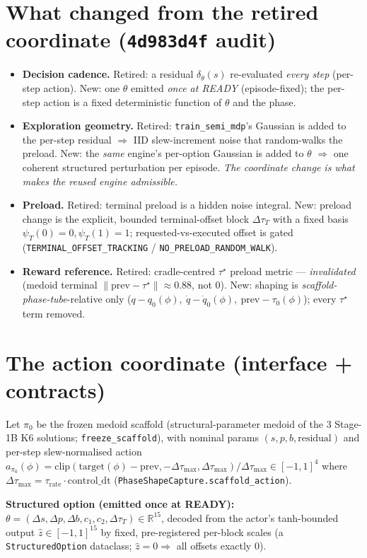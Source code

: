 \documentclass[11pt]{article}
\newcommand{\code}[1]{\texttt{\small #1}}
\newcommand{\slew}{\ensuremath{\Delta\tau_{\max}}}
\begin{document}
\section{What changed from the retired coordinate (\code{4d983d4f} audit)}
\begin{itemize}[nosep,leftmargin=1.4em]
  \item \textbf{Decision cadence.} Retired: a residual $\delta_\theta(s)$ re-evaluated \emph{every step} (per-step action).
  New: one $\theta$ emitted \emph{once at READY} (episode-fixed); the per-step action is a fixed deterministic function of
  $\theta$ and the phase.
  \item \textbf{Exploration geometry.} Retired: \code{train\_semi\_mdp}'s Gaussian is added to the per-step residual
  $\Rightarrow$ IID slew-increment noise that random-walks the preload. New: the \emph{same} engine's per-option Gaussian is
  added to $\theta$ $\Rightarrow$ one coherent structured perturbation per episode. \emph{The coordinate change is what makes
  the reused engine admissible.}
  \item \textbf{Preload.} Retired: terminal preload is a hidden noise integral. New: preload change is the explicit,
  bounded terminal-offset block $\Delta\tau_T$ with a fixed basis $\psi_T(0){=}0,\psi_T(1){=}1$; requested-vs-executed
  offset is gated (\code{TERMINAL\_OFFSET\_TRACKING} / \code{NO\_PRELOAD\_RANDOM\_WALK}).
  \item \textbf{Reward reference.} Retired: cradle-centred $\tau^\star$ preload metric --- \emph{invalidated} (medoid
  terminal $\lVert\text{prev}-\tau^\star\rVert\!\approx\!0.88$, not $0$). New: shaping is \emph{scaffold-phase-tube}-relative
  only ($q-q_0(\phi),\ \dot q-\dot q_0(\phi),\ \text{prev}-\tau_0(\phi)$); every $\tau^\star$ term removed.
\end{itemize}

\section{The action coordinate (interface + contracts)}
Let $\pi_0$ be the frozen medoid scaffold (structural-parameter medoid of the 3 Stage-1B K6 solutions;
\code{freeze\_scaffold}), with nominal params $(s,p,b,\text{residual})$ and per-step slew-normalised action
$a_{\pi_0}(\phi)=\mathrm{clip}(\text{target}(\phi)-\text{prev},-\slew,\slew)/\slew\in[-1,1]^4$ where
$\slew=\tau_{\mathrm{rate}}\!\cdot\!\text{control\_dt}$ (\code{PhaseShapeCapture.scaffold\_action}).

\textbf{Structured option (emitted once at READY):}
$\theta=(\Delta s,\Delta p,\Delta b,c_1,c_2,\Delta\tau_T)\in\mathbb{R}^{15}$, decoded from the actor's tanh-bounded output
$\hat z\in[-1,1]^{15}$ by fixed, pre-registered per-block scales (a \code{StructuredOption} dataclass; $\hat z{=}0\Rightarrow$
all offsets exactly $0$).
\end{document}
